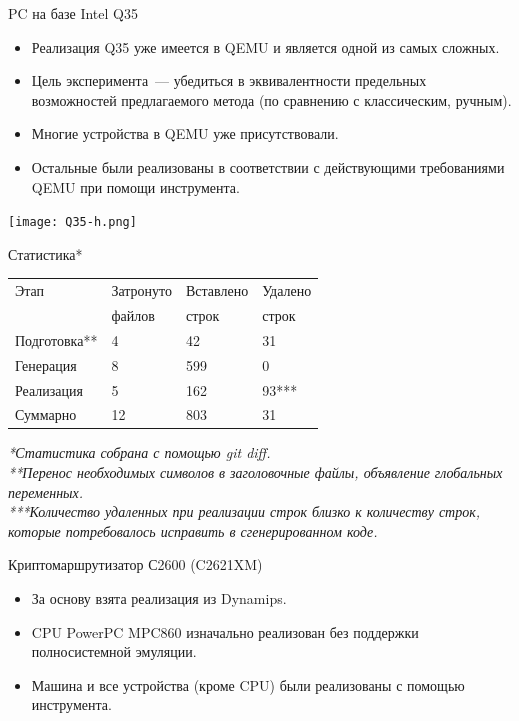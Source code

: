 \documentclass[unicode,hyperref={unicode=true}]{beamer}
\theoremstyle{definition}
\theoremstyle{plain}
\begin{document}
\begin{frame}{PC на базе Intel Q35}
\begin{itemize}
\item Реализация Q35 уже имеется в QEMU и является одной из самых сложных.
\item Цель эксперимента~--- убедиться в эквивалентности предельных возможностей
предлагаемого метода (по сравнению с классическим, ручным).
\item Многие устройства в QEMU уже присутствовали.
\item Остальные были реализованы в соответствии с действующими требованиями
QEMU при помощи инструмента.
\end{itemize}
\end{frame}



\begin{frame}{}
\begin{center}
\texttt{[image: Q35-h.png]}
\end{center}
\end{frame}



\begin{frame}{Статистика*}
\begin{center}
\begin{tabular}{l|lll}
Этап         & Затронуто & Вставлено & Удалено \\
             & файлов    & строк     & строк   \\
\hline
Подготовка** & 4         & 42        & 31      \\
Генерация    & 8         & 599       & 0       \\
Реализация   & 5         & 162       & 93***   \\
Суммарно     & 12        & 803       & 31      \\
\end{tabular}
\end{center}
\vfill
\it{*Статистика собрана с помощью git diff.}\\
\it{**Перенос необходимых символов в заголовочные файлы,
объявление глобальных переменных.}\\
\it{***Количество удаленных при реализации строк близко к количеству строк,
которые потребовалось исправить в сгенерированном коде.}
\end{frame}



\begin{frame}{Криптомаршрутизатор С2600 (C2621XM)}
\begin{itemize}
\item За основу взята реализация из Dynamips.
\item CPU PowerPC MPC860 изначально реализован без поддержки полносистемной
эмуляции.
\item Машина и все устройства (кроме CPU) были реализованы с помощью
инструмента.
\end{itemize}
\end{frame}
\end{document}
